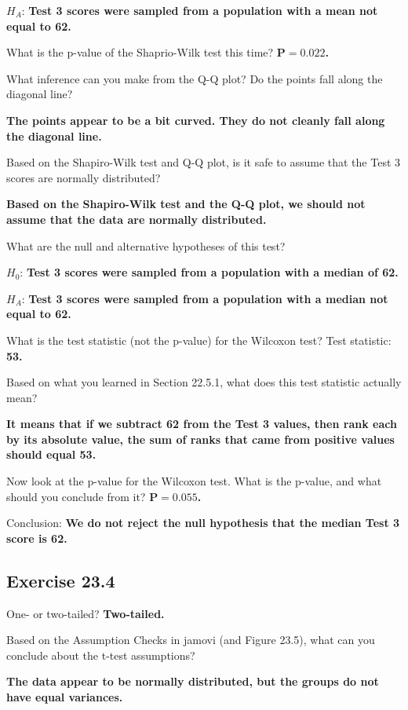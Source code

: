 \documentclass[
  openany]{krantz}
\begin{document}
\(H_{A}\): \textbf{Test 3 scores were sampled from a population with a mean not equal to 62.}

What is the p-value of the Shaprio-Wilk test this time? \textbf{\(\mathbf{P = 0.022}\).}

What inference can you make from the Q-Q plot? Do the points fall along the diagonal line?

\textbf{The points appear to be a bit curved. They do not cleanly fall along the diagonal line.}

Based on the Shapiro-Wilk test and Q-Q plot, is it safe to assume that the Test 3 scores are normally distributed?

\textbf{Based on the Shapiro-Wilk test and the Q-Q plot, we should not assume that the data are normally distributed.}

What are the null and alternative hypotheses of this test?

\(H_{0}\): \textbf{Test 3 scores were sampled from a population with a median of 62.}

\(H_{A}\): \textbf{Test 3 scores were sampled from a population with a median not equal to 62.}

What is the test statistic (not the p-value) for the Wilcoxon test? Test statistic: \textbf{53.}

Based on what you learned in Section 22.5.1, what does this test statistic actually mean?

\textbf{It means that if we subtract 62 from the Test 3 values, then rank each by its absolute value, the sum of ranks that came from positive values should equal 53.}

Now look at the p-value for the Wilcoxon test. What is the p-value, and what
should you conclude from it? \textbf{\(\mathbf{P = 0.055}\).}

Conclusion: \textbf{We do not reject the null hypothesis that the median Test 3 score is 62.}

\hypertarget{exercise-23.4}{%
\subsection{Exercise 23.4}\label{exercise-23.4}}

One- or two-tailed? \textbf{Two-tailed.}

Based on the Assumption Checks in jamovi (and Figure 23.5), what can you conclude about the t-test assumptions?

\textbf{The data appear to be normally distributed, but the groups do not have equal variances.}
\end{document}
